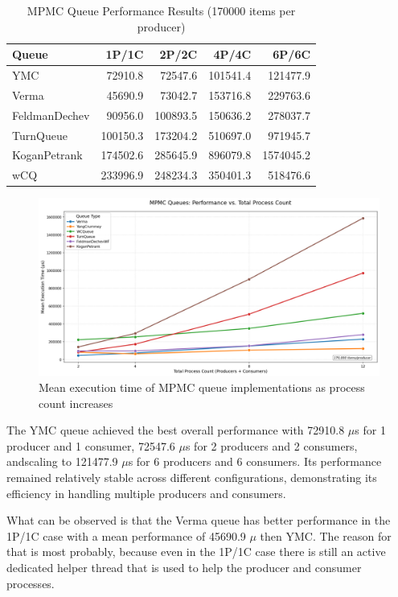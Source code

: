 \begin{table}[htb]
\centering
\caption{\ac{MPMC} Queue Performance Results (170000 items per producer)}
\label{tab:mpmc-results}
\begin{tabular}{@{}lrrrr@{}}
\toprule
Queue & 1P/1C & 2P/2C & 4P/4C & 6P/6C \\
\midrule
\ac{YMC} & 72910.8 & 72547.6 & 101541.4 & 121477.9 \\
Verma & 45690.9 & 73042.7 & 153716.8 & 229763.6 \\
FeldmanDechev & 90956.0 & 100893.5 & 150636.2 & 278037.7 \\
TurnQueue & 100150.3 & 173204.2 & 510697.0 & 971945.7 \\
KoganPetrank & 174502.6 & 285645.9 & 896079.8 & 1574045.2 \\
\ac{wCQ} & 233996.9 & 248234.3 & 350401.3 & 518476.6 \\
\bottomrule
\end{tabular}
\end{table}

\begin{figure}[htb]
\centering
\caption{Mean execution time of MPMC queue implementations as process count increases}
\label{fig:mpmc-mean-performance}
\includegraphics[width=\textwidth]{images/results/mpmc_mean_performance_vs_processes.png}
\end{figure}

The \ac{YMC} queue achieved the best overall performance with 72910.8 $\mu$s for 1 producer and 1 consumer, 72547.6 $\mu$s for 2 producers and 2 consumers, andscaling to 121477.9 $\mu$s for 6 producers and 6 consumers. Its performance remained relatively stable across different configurations, demonstrating its efficiency in handling multiple producers and consumers.

What can be observed is that the Verma queue has better performance in the 1P/1C case with a mean performance of 45690.9 $\mu$ then \ac{YMC}. The reason for that is most probably, because even in the 1P/1C case there is still an active dedicated helper thread that is used to help the producer and consumer processes.

